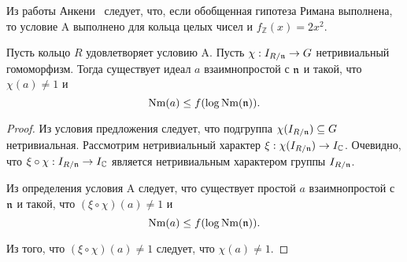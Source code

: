 \documentclass[_00_dissertation.tex]{subfiles}
\begin{document}
\begin{remark}
    Из работы Анкени~\cite{source:Ankeny} следует, что, если обобщенная гипотеза Римана выполнена, то условие A выполнено для кольца целых чисел и $f_{\mathbb{Z}}(x) = 2x^2$.
\end{remark}

\begin{proposition}\label{proposition:condition_A_with_any_homomorphism}
    Пусть кольцо $R$ удовлетворяет условию A.
    Пусть $\chi: I_{R/\mathfrak{n}} \to G$ нетривиальный гомоморфизм.
    Тогда существует идеал $a$ взаимнопростой с $\mathfrak{n}$ и такой, что $\chi(a) \neq 1$ и
    \begin{equation*}
        \textrm{Nm}(a) \le f(\log{\textrm{Nm}(\mathfrak{n})}).
    \end{equation*}
\end{proposition}
\begin{proof}
    Из условия предложения следует, что подгруппа $\chi(I_{R/\mathfrak{n}}) \subseteq G$ нетривиальная.
    Рассмотрим нетривиальный характер $\xi: \chi(I_{R/\mathfrak{n}}) \to I_{\mathbb{C}}$.
    Очевидно, что $\xi \circ \chi: I_{R/\mathfrak{n}} \to I_{\mathbb{C}}$ является нетривиальным характером группы $I_{R/\mathfrak{n}}$.
    
    Из определения условия A следует, что существует простой $a$ взаимнопростой с $\mathfrak{n}$ и такой, что $(\xi \circ \chi)(a) \neq 1$ и
    \begin{equation*}
        \textrm{Nm}(a) \le f(\log{\textrm{Nm}(\mathfrak{n})}).
    \end{equation*}
    
    Из того, что $(\xi \circ \chi)(a) \neq 1$ следует, что $\chi(a) \neq 1$.
\end{proof}
\end{document}
